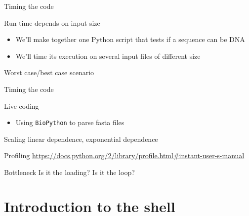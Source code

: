 \documentclass[big]{beamer}
\begin{document}
\begin{frame}[label=sec-1-4]{Timing the code}
\begin{block}{Run time depends on input size}
\begin{itemize}
\item We'll make together one Python script that tests if a sequence can be DNA
\item We'll time its execution on several input files of different size
\end{itemize}
\end{block}
\begin{block}{Worst case/best case scenario}
\end{block}
\end{frame}
\begin{frame}[fragile,label=sec-1-5]{Timing the code}
 \begin{block}{Live coding}
\begin{itemize}
\item Using \texttt{BioPython} to parse fasta files
\end{itemize}
\end{block}
\end{frame}

\begin{frame}[label=sec-1-6]{Scaling}
linear dependence, exponential dependence
\end{frame}
\begin{frame}[label=sec-1-7]{Profiling}
\url{https://docs.python.org/2/library/profile.html#instant-user-s-manual}
\end{frame}
\begin{frame}[label=sec-1-8]{Bottleneck}
Is it the loading? Is it the loop?
\end{frame}
\section{Introduction to the shell}
\label{sec-2}
\end{document}
